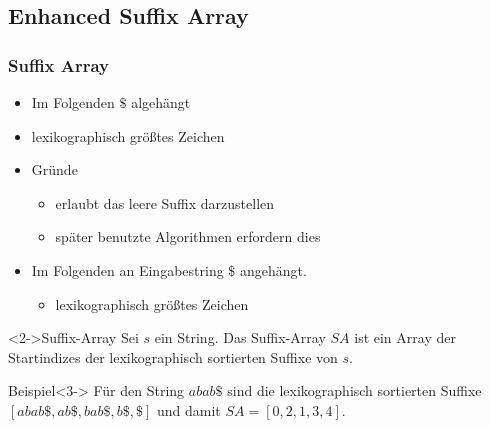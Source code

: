 \subsection{Enhanced Suffix Array}

\begin{frame}
    \frametitle{Suffix Array}
	
	 {
		\begin{itemize}
			\item Im Folgenden $\$$ algehängt
			\item lexikographisch größtes Zeichen
			\item Gründe \begin{itemize}
				\item erlaubt das leere Suffix darzustellen
				\item später benutzte Algorithmen erfordern dies
			\end{itemize}
		\end{itemize}
	}

	\begin{itemize}
		\item<1-> Im Folgenden an Eingabestring $\$$ angehängt. \begin{itemize}
			\item lexikographisch größtes Zeichen
		\end{itemize}
	\end{itemize}

    \begin{block}<2->{Suffix-Array}
        Sei $s$ ein String. Das Suffix-Array $SA$ ist ein Array der Startindizes der lexikographisch sortierten Suffixe von $s$. 
    \end{block}

    \begin{exampleblock}{Beispiel}<3->
        Für den String $abab\$$ sind die lexikographisch sortierten Suffixe 
		$[abab\$, ab\$, bab\$, b\$, \$]$ und damit $SA = [0, 2, 1, 3, 4]$.
    \end{exampleblock}

\end{frame}

